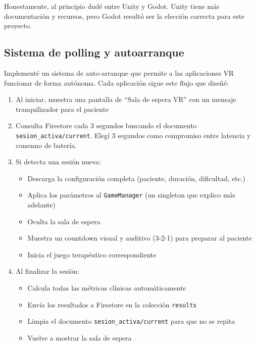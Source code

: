 Honestamente, al principio dudé entre Unity y Godot. Unity tiene más documentación y recursos, pero Godot resultó ser la elección correcta para este proyecto.

\subsection{Sistema de polling y autoarranque}

Implementé un sistema de auto-arranque que permite a las aplicaciones VR funcionar de forma autónoma. Cada aplicación sigue este flujo que diseñé:

\begin{enumerate}
    \item Al iniciar, muestra una pantalla de ``Sala de espera VR'' con un mensaje tranquilizador para el paciente
    
    \item Consulta Firestore cada 3 segundos buscando el documento \texttt{sesion\_activa/current}. Elegí 3 segundos como compromiso entre latencia y consumo de batería.
    
    \item Si detecta una sesión nueva:
    \begin{itemize}
        \item Descarga la configuración completa (paciente, duración, dificultad, etc.)
        \item Aplica los parámetros al \texttt{GameManager} (un singleton que explico más adelante)
        \item Oculta la sala de espera
        \item Muestra un countdown visual y auditivo (3-2-1) para preparar al paciente
        \item Inicia el juego terapéutico correspondiente
    \end{itemize}
    
    \item Al finalizar la sesión:
    \begin{itemize}
        \item Calcula todas las métricas clínicas automáticamente
        \item Envía los resultados a Firestore en la colección \texttt{results}
        \item Limpia el documento \texttt{sesion\_activa/current} para que no se repita
        \item Vuelve a mostrar la sala de espera
    \end{itemize}
\end{enumerate}

